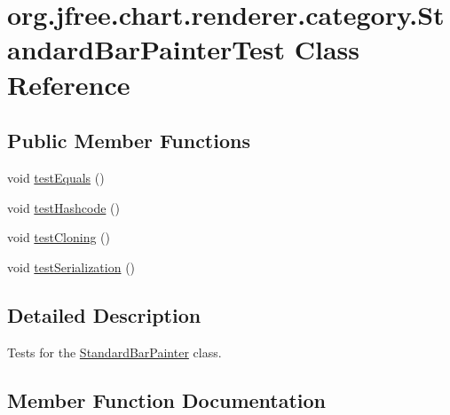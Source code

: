 \hypertarget{classorg_1_1jfree_1_1chart_1_1renderer_1_1category_1_1_standard_bar_painter_test}{}\section{org.\+jfree.\+chart.\+renderer.\+category.\+Standard\+Bar\+Painter\+Test Class Reference}
\label{classorg_1_1jfree_1_1chart_1_1renderer_1_1category_1_1_standard_bar_painter_test}
\subsection*{Public Member Functions}
\begin{DoxyCompactItemize}
\item 
void \mbox{\hyperlink{classorg_1_1jfree_1_1chart_1_1renderer_1_1category_1_1_standard_bar_painter_test_ab8b2293cb70879f905f71e128ffb5bda}{test\+Equals}} ()
\item 
void \mbox{\hyperlink{classorg_1_1jfree_1_1chart_1_1renderer_1_1category_1_1_standard_bar_painter_test_ad5be9ab94db985269f75f25ef46c2606}{test\+Hashcode}} ()
\item 
void \mbox{\hyperlink{classorg_1_1jfree_1_1chart_1_1renderer_1_1category_1_1_standard_bar_painter_test_ac9769d1a91abfdd86125640a05bb1068}{test\+Cloning}} ()
\item 
void \mbox{\hyperlink{classorg_1_1jfree_1_1chart_1_1renderer_1_1category_1_1_standard_bar_painter_test_a9515cf263ea33ca763f0bb497d8c784a}{test\+Serialization}} ()
\end{DoxyCompactItemize}


\subsection{Detailed Description}
Tests for the \mbox{\hyperlink{classorg_1_1jfree_1_1chart_1_1renderer_1_1category_1_1_standard_bar_painter}{Standard\+Bar\+Painter}} class. 

\subsection{Member Function Documentation}
\mbox{\label{classorg_1_1jfree_1_1chart_1_1renderer_1_1category_1_1_standard_bar_painter_test_ac9769d1a91abfdd86125640a05bb1068}} 
